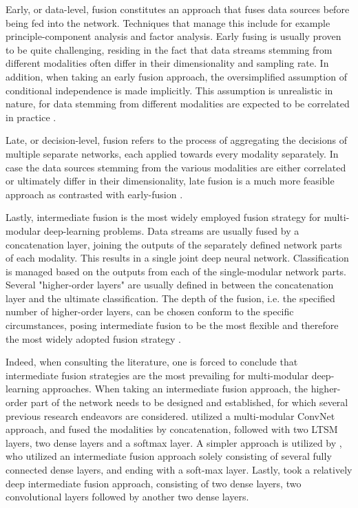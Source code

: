 \documentclass[12pt]{article}
\begin{document}
Early, or data-level, fusion constitutes an approach that fuses data sources before being fed into the network. Techniques that manage this include for example principle-component analysis and factor analysis. Early fusing is usually proven to be quite challenging, residing in the fact that data streams stemming from different modalities often differ in their dimensionality and sampling rate. In addition, when taking an early fusion approach, the oversimplified assumption of conditional independence is made implicitly. This assumption is unrealistic in nature, for data stemming from different modalities are expected to be correlated in practice \cite{ramachandram2017deep}. 

Late, or decision-level, fusion refers to the process of aggregating the decisions of multiple separate networks, each applied towards every modality separately. In case the data sources stemming from the various modalities are either correlated or ultimately differ in their dimensionality, late fusion is a much more feasible approach as contrasted with early-fusion \cite{ramachandram2017deep}.

Lastly, intermediate fusion is the most widely employed fusion strategy for multi-modular deep-learning problems. Data streams are usually fused by a concatenation layer, joining the outputs of the separately defined network parts of each modality. This results in a single joint deep neural network. Classification is managed based on the outputs from each of the single-modular network parts. Several "higher-order layers" are usually defined in between the concatenation layer and the ultimate classification. The depth of the fusion, i.e. the specified number of higher-order layers, can be chosen conform to the specific circumstances, posing intermediate fusion to be the most flexible and therefore the most widely adopted fusion strategy \cite{ramachandram2017deep}.

Indeed, when consulting the literature, one is forced to conclude that intermediate fusion strategies are the most prevailing for multi-modular deep-learning approaches. When taking an intermediate fusion approach, the higher-order part of the network needs to be designed and established, for which several previous research endeavors are considered.   utilized a multi-modular ConvNet approach, and fused the modalities by concatenation, followed with two LTSM layers, two dense layers and a softmax layer. A simpler approach is utilized by , who utilized an intermediate fusion approach solely consisting of several fully connected dense layers, and ending with a soft-max layer. Lastly,  took a relatively deep intermediate fusion approach, consisting of two dense layers, two convolutional layers followed by another two dense layers.  
\end{document}
